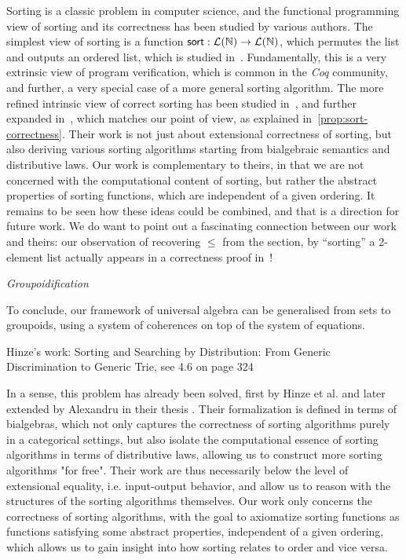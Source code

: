 Sorting is a classic problem in computer science, and the functional programming view of sorting and its correctness has
been studied by various authors.
%
The simplest view of sorting is a function $\operatorname{\mathsf{sort}}: \mathcal{L}(\mathbb{N}) \to \mathcal{L}(\mathbb{N})$,
which permutes the list and outputs an ordered list, which is studied in~\cite{appelVerifiedFunctionalAlgorithms2023}.
%
Fundamentally, this is a very extrinsic view of program verification, which is common in the \emph{Coq} community,
and further, a very special case of a more general sorting algorithm.
%
The more refined intrinsic view of correct sorting has been studied in~\cite{hinzeSortingBialgebrasDistributive2012},
and further expanded in~\cite{alexandruIntrinsicallyCorrectSorting2023}, which matches our point of view, as explained
in~\cref{prop:sort-correctness}.
%
Their work is not just about extensional correctness of sorting, but also deriving various sorting algorithms
starting from bialgebraic semantics and distributive laws.
%
Our work is complementary to theirs, in that we are not concerned with the computational content of sorting, but rather
the abstract properties of sorting functions, which are independent of a given ordering.
%
It remains to be seen how these ideas could be combined, and that is a direction for future work.
%
We do want to point out a fascinating connection between our work and theirs: our observation of recovering $\leq$ from
the section, by ``sorting'' a 2-element list actually appears in a correctness proof
in~\cite[Section~4.6,pg.324]{hengleinSortingSearchingDistribution2013}!

\emph{Groupoidification}

To conclude, our framework of universal algebra can be generalised from sets to groupoids, using a system of
coherences on top of the system of equations.

Hinze's work: Sorting and Searching by Distribution: From Generic Discrimination to Generic Trie, see 4.6 on page 324



In a sense, this problem has already been solved, first by Hinze et al. \cite{hinzeSortingBialgebrasDistributive2012}
and later extended by Alexandru in their thesis \cite{alexandruIntrinsicallyCorrectSorting2023}.
Their formalization is defined in terms of bialgebras, which not
only captures the correctness of sorting algorithms purely in a categorical settings, but
also isolate the computational essence of sorting algorithms in terms of distributive laws,
allowing us to construct more sorting algorithms "for free". Their work are thus necessarily
below the level of extensional equality, i.e. input-output behavior, and allow us to reason
with the structures of the sorting algorithms themselves. Our work only concerns the correctness
of sorting algorithms, with the goal to axiomatize sorting functions as functions satisfying
some abstract properties, independent of a given ordering, which allows us to gain
insight into how sorting relates to order and vice versa.
